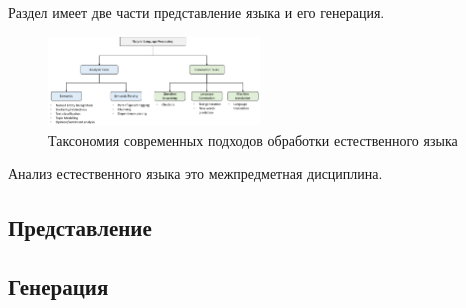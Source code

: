 Раздел имеет две части представление языка и его генерация.

\begin{figure}[h]
    \centering
    \includegraphics[width=0.5\textwidth]{assets/nlp/taxonomy.png}
    \caption{Таксономия современных подходов обработки естественного языка}
    \label{llm_taxonomy}
\end{figure}

Анализ естественного языка это межпредметная дисциплина.


\subsection{Представление}


\subsection{Генерация}

